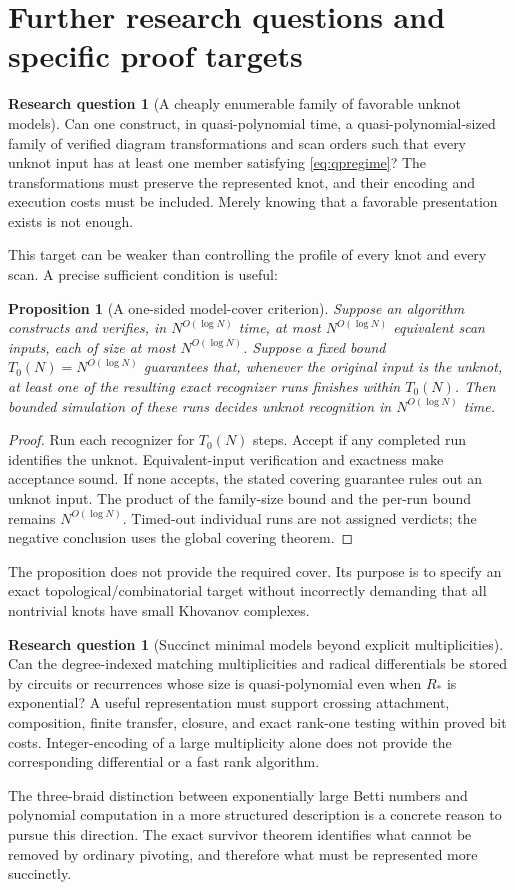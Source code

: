 \documentclass[11pt,letterpaper]{article}
\newtheorem{proposition}[theorem]{Proposition}
\theoremstyle{definition}
\newtheorem{question}[theorem]{Research question}
\theoremstyle{remark}
\begin{document}
\section{Further research questions and specific proof targets}
\label{sec:questions}
\begin{question}[A cheaply enumerable family of favorable unknot models]
Can one construct, in quasi-polynomial time, a quasi-polynomial-sized family of
verified diagram transformations and scan orders such that every unknot input
has at least one member satisfying \cref{eq:qpregime}? The transformations
must preserve the represented knot, and their encoding and execution costs
must be included. Merely knowing that a favorable presentation exists is not
enough.
\end{question}
This target can be weaker than controlling the profile of every knot and every
scan. A precise sufficient condition is useful:
\begin{proposition}[A one-sided model-cover criterion]\label{prop:cover}
Suppose an algorithm constructs and verifies, in $N^{O(\log N)}$ time,
at most $N^{O(\log N)}$ equivalent
scan inputs, each of size at most $N^{O(\log N)}$. Suppose a fixed bound
$T_0(N)=N^{O(\log N)}$ guarantees that, whenever the original input is the
unknot, at least one of the resulting exact recognizer runs finishes within
$T_0(N)$. Then bounded simulation of these runs decides unknot recognition in
$N^{O(\log N)}$ time.
\end{proposition}
\begin{proof}
Run each recognizer for $T_0(N)$ steps. Accept if any completed run identifies
the unknot. Equivalent-input verification and exactness make acceptance sound.
If none accepts, the stated covering guarantee rules out an unknot input.
The product of the family-size bound and the per-run bound remains
$N^{O(\log N)}$. Timed-out individual runs are not assigned verdicts; the
negative conclusion uses the global covering theorem.
\end{proof}
The proposition does not provide the required cover. Its purpose is to specify
an exact topological/combinatorial target without incorrectly demanding that
all nontrivial knots have small Khovanov complexes.

\begin{question}[Succinct minimal models beyond explicit multiplicities]
Can the degree-indexed matching multiplicities and radical differentials be
stored by circuits or recurrences whose size is quasi-polynomial even when
$R_*$ is exponential? A useful representation must support crossing attachment,
composition, finite transfer, closure, and exact rank-one testing within proved
bit costs. Integer-encoding of a large multiplicity alone does not provide the
corresponding differential or a fast rank algorithm.
\end{question}
The three-braid distinction between exponentially large Betti numbers and
polynomial computation in a more structured description \cite{ks26} is a
concrete reason to pursue this direction. The exact survivor theorem identifies
what cannot be removed by ordinary pivoting, and therefore what must be
represented more succinctly.
\end{document}
